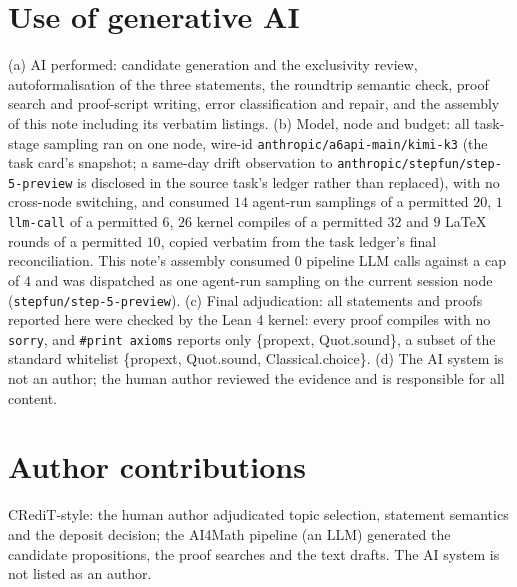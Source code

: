 \documentclass[11pt]{article}
\theoremstyle{definition}
\begin{document}
\section*{Use of generative AI}

(a) AI performed: candidate generation and the exclusivity review,
autoformalisation of the three statements, the roundtrip semantic check,
proof search and proof-script writing, error classification and repair, and
the assembly of this note including its verbatim listings. (b) Model, node
and budget: all task-stage sampling ran on one node, wire-id
\texttt{anthropic/a6api-main/kimi-k3} (the task card's snapshot; a same-day
drift observation to \texttt{anthropic/stepfun/step-5-preview} is disclosed
in the source task's ledger rather than replaced), with no cross-node
switching, and consumed $14$ agent-run samplings of a permitted $20$, $1$
\texttt{llm-call} of a permitted $6$, $26$ kernel compiles of a permitted
$32$ and $9$ LaTeX rounds of a permitted $10$, copied verbatim from the task
ledger's final reconciliation. This note's assembly consumed $0$ pipeline
LLM calls against a cap of $4$ and was dispatched as one agent-run sampling
on the current session node (\texttt{stepfun/step-5-preview}). (c) Final
adjudication: all statements and proofs reported here were checked by the
Lean 4 kernel: every proof compiles with no \texttt{sorry}, and
\texttt{\#print axioms} reports only \{propext, Quot.sound\}, a subset of the
standard whitelist \{propext, Quot.sound, Classical.choice\}. (d) The AI
system is not an author; the human author reviewed the evidence and is
responsible for all content.

\section*{Author contributions}

CRediT-style: the human author adjudicated topic selection, statement
semantics and the deposit decision; the AI4Math pipeline (an LLM) generated
the candidate propositions, the proof searches and the text drafts. The AI
system is not listed as an author.
\end{document}
